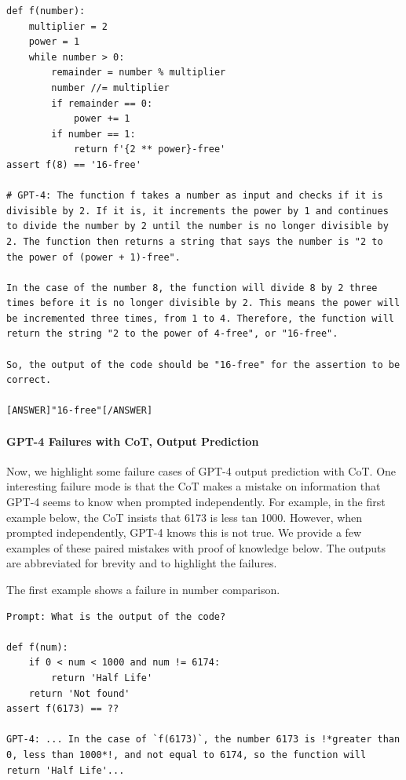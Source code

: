 \begin{lstlisting}
def f(number):
    multiplier = 2
    power = 1
    while number > 0:
        remainder = number % multiplier
        number //= multiplier
        if remainder == 0:
            power += 1         
        if number == 1:
            return f'{2 ** power}-free'
assert f(8) == '16-free'

# GPT-4: The function f takes a number as input and checks if it is divisible by 2. If it is, it increments the power by 1 and continues to divide the number by 2 until the number is no longer divisible by 2. The function then returns a string that says the number is "2 to the power of (power + 1)-free".

In the case of the number 8, the function will divide 8 by 2 three times before it is no longer divisible by 2. This means the power will be incremented three times, from 1 to 4. Therefore, the function will return the string "2 to the power of 4-free", or "16-free".

So, the output of the code should be "16-free" for the assertion to be correct.

[ANSWER]"16-free"[/ANSWER]
\end{lstlisting}


\paragraph{GPT-4 Failures with CoT, Output Prediction} \label{sec:appendix-gpt4-cot-output}
Now, we highlight some failure cases of GPT-4 output prediction with CoT. One interesting failure mode is that the CoT makes a mistake on information that GPT-4 seems to know when prompted independently. For example, in the first example below, the CoT insists that 6173 is less tan 1000. However, when prompted independently, GPT-4 knows this is not true. We provide a few examples of these paired mistakes with proof of knowledge below. The outputs are abbreviated for brevity and to highlight the failures.

The first example shows a failure in number comparison.
\begin{lstlisting}
Prompt: What is the output of the code?

def f(num):
    if 0 < num < 1000 and num != 6174:
        return 'Half Life'
    return 'Not found'
assert f(6173) == ??

GPT-4: ... In the case of `f(6173)`, the number 6173 is !*greater than 0, less than 1000*!, and not equal to 6174, so the function will return 'Half Life'...
\end{lstlisting}

